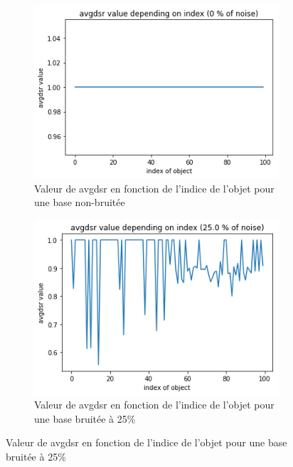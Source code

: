\documentclass[a4paper]{article}
\begin{document}
\begin{figure}[H]
	\centering
    \begin{subfigure}[c]{0.46\textwidth}
	    \centering
        \includegraphics[width=\textwidth]{images/avgdsr_0.png}
        \caption{Valeur de avgdsr en fonction de l'indice de l'objet pour une base
        non-bruitée}
        \label{img:avgdsr0}
    \end{subfigure}
    \begin{subfigure}[c]{0.46\textwidth}
	    \centering
	    \includegraphics[width=\textwidth]{images/avgdsr_25.png}
        \caption{Valeur de avgdsr en fonction de l'indice de l'objet pour une base
        bruitée à 25\%}
        \label{img:avgdsr25}
    \end{subfigure}


\end{figure}
\end{document}

